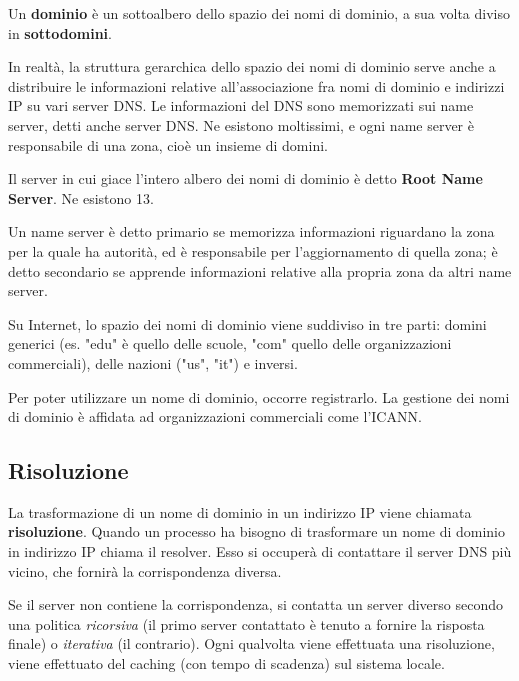     Un \textbf{dominio} è un sottoalbero dello spazio dei nomi di dominio, a sua volta diviso in \textbf{sottodomini}.
    
    \vspace{3mm}
    
    In realtà, la struttura gerarchica dello spazio dei nomi di dominio serve anche a distribuire le informazioni relative all'associazione fra nomi di dominio e indirizzi IP su vari server DNS. Le informazioni del DNS sono memorizzati sui name server, detti anche server DNS. Ne esistono moltissimi, e ogni name server è responsabile di una zona, cioè un insieme di domini.
    
    \vspace{3mm}
    
    Il server in cui giace l'intero albero dei nomi di dominio è detto \textbf{Root Name Server}. Ne esistono 13.
    
    \vspace{3mm}
    
    Un name server è detto primario se memorizza informazioni riguardano la zona per la quale ha autorità, ed è responsabile per l'aggiornamento di quella zona; è detto secondario se apprende informazioni relative alla propria zona da altri name server.
    
    \vspace{3mm}
    
    Su Internet, lo spazio dei nomi di dominio viene suddiviso in tre parti: domini generici (es. "edu" è quello delle scuole, "com" quello delle organizzazioni commerciali), delle nazioni ("us", "it") e inversi.
    
    \vspace{3mm}
    
    Per poter utilizzare un nome di dominio, occorre registrarlo. La gestione dei nomi di dominio è affidata ad organizzazioni commerciali come l'ICANN.
    
    \subsection{Risoluzione}
    
        La trasformazione di un nome di dominio in un indirizzo IP viene chiamata \textbf{risoluzione}. Quando un processo ha bisogno di trasformare un nome di dominio in indirizzo IP chiama il resolver. Esso si occuperà di contattare il server DNS più vicino, che fornirà la corrispondenza diversa. 
        
        Se il server non contiene la corrispondenza, si contatta un server diverso secondo una politica \textit{ricorsiva} (il primo server contattato è tenuto a fornire la risposta finale) o \textit{iterativa} (il contrario). Ogni qualvolta viene effettuata una risoluzione, viene effettuato del caching (con tempo di scadenza) sul sistema locale.
        
